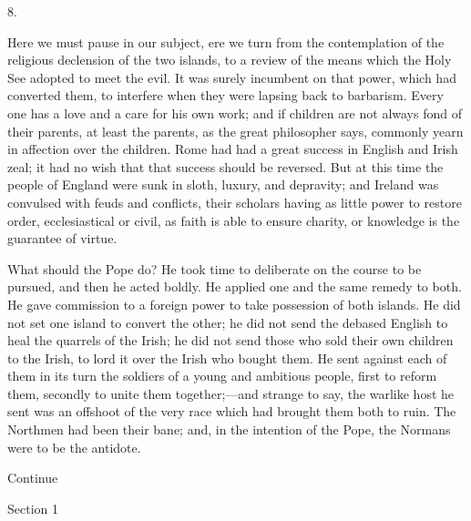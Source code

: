 8.

Here we must pause in our
subject, ere we turn from the contemplation of the religious
declension of the two islands, to a review of the means which the Holy
See adopted to meet the evil. It was surely incumbent on that power,
which had converted them, to interfere when they were lapsing back to
barbarism. Every one has a love and a care for his own work; and if
children are not always fond of their parents, at least the parents,
as the great philosopher says, commonly yearn in affection over the
children. Rome had had a great success in English and Irish zeal; it
had no wish that that success should be reversed. But at this time the
people of England were sunk in sloth, luxury, and depravity; and
Ireland was convulsed with feuds and conflicts, their scholars having
as little power to restore order, ecclesiastical or civil, as
faith is able to ensure charity, or knowledge is the guarantee of
virtue.

What should the Pope do? He
took time to deliberate on the course to be pursued, and then he acted
boldly. He applied one and the same remedy to both. He gave commission
to a foreign power to take possession of both islands. He did not set
one island to convert the other; he did not send the debased English
to heal the quarrels of the Irish; he did not send those who sold
their own children to the Irish, to lord it over the Irish who bought
them. He sent against each of them in its turn the soldiers of a young
and ambitious people, first to reform them, secondly to unite them
together;—and strange to say, the warlike host he sent was an
offshoot of the very race which had brought them both to ruin. The
Northmen had been their bane; and, in the intention of the Pope, the
Normans were to be the antidote.

Continue

Section 1


